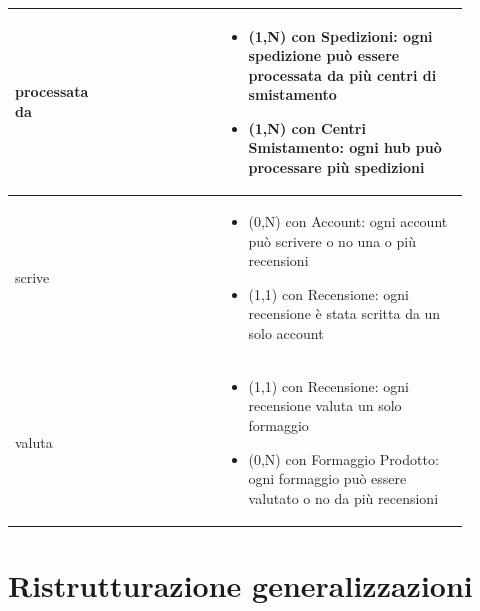 \documentclass[12pt,a4paper]{article}
\begin{document}
\begin{center}
\begin{longtable}{|p{0.16\linewidth}|p{0.24\linewidth}|p{0.50\linewidth}|}
\hline
processata da 				&   
					& \begin{itemize}
						\setlength{\itemindent}{-1em}
						\vspace{-25pt}
						\setlength\itemsep{-0.25em}
						\item (1,N) con Spedizioni: ogni spedizione può essere processata da più centri di smistamento
						\item (1,N) con Centri Smistamento: ogni hub può processare più spedizioni
					\end{itemize}\\ 

\hline
scrive 				&   
					& \begin{itemize}
						\setlength{\itemindent}{-1em}
						\vspace{-25pt}
						\setlength\itemsep{-0.25em}
						\item (0,N) con Account: ogni account può scrivere o no una o più recensioni
						\item (1,1) con Recensione: ogni recensione è stata scritta da un solo account
					\end{itemize}\\ 

\hline
valuta 				&   
					& \begin{itemize}
						\setlength{\itemindent}{-1em}
						\vspace{-25pt}
						\setlength\itemsep{-0.25em}
						\item (1,1) con Recensione: ogni recensione valuta un solo formaggio
						\item (0,N) con Formaggio Prodotto: ogni formaggio può essere valutato o no da più recensioni
					\end{itemize}\\ 

\hline

\end{longtable}
\end{center}
\pagebreak
\section{Ristrutturazione generalizzazioni}
\label{sec:ristrutturazione}
\end{document}
